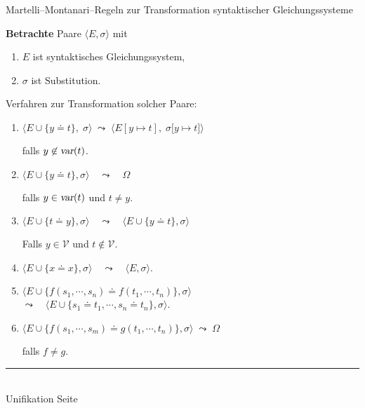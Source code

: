 \documentclass{slides}
\newcommand{\myrule}{\rule{20cm}{1mm}\\ }
\newcounter{mypage}
\begin{document}
\begin{slide}{}
\normalsize
\begin{center}
Martelli--Montanari--Regeln zur Transformation
 syntaktischer Gleichungssysteme 
\end{center}
\vspace{0.5cm}

\footnotesize
\textbf{Betrachte} Paare $\langle E, \sigma \rangle$ mit
\begin{enumerate}
\item $E$ ist syntaktisches Gleichungssystem,
\item $\sigma$ ist Substitution.
\end{enumerate}

Verfahren zur Transformation solcher Paare:
\begin{enumerate}
\item $\langle E \cup \big\{ y \doteq t \big\},\; \sigma \rangle \;\leadsto\; \langle E[y \mapsto t],\; \sigma\big[ y \mapsto t \big]  \rangle$

      falls $y \not\in \textsl{var}(t)$.
\item $\langle E \cup \big\{ y \doteq t \big\}, \sigma \rangle \quad\leadsto\quad \Omega $

      falls $y \in \textsl{var}(t)$ und $t \not= y$.
\item $\langle E \cup \big\{ t \doteq y \big\}, \sigma \rangle \quad\leadsto\quad \langle E \cup \big\{ y \doteq t \big\}, \sigma \rangle$

      Falls $y \in \mathcal{V}$ und $t \not\in \mathcal{V}$.
\item $\langle E \cup \big\{ x \doteq x \big\}, \sigma \rangle \quad\leadsto\quad \langle E, \sigma \rangle$.
\item \hspace*{1.25cm} $\langle E \cup \big\{ f(s_1,\cdots,s_n) \doteq f(t_1,\cdots,t_n) \big\}, \sigma \rangle$ \\[0.2cm]
       $\leadsto\quad \langle E \cup \big\{ s_1 \doteq t_1, \cdots, s_n \doteq t_n\}, \sigma \rangle$.
\item $\langle E \cup \big\{ f(s_1,\cdots,s_m) \doteq g(t_1,\cdots,t_n) \big\}, \sigma \rangle \;\leadsto\; \Omega$

      falls $f \not= g$.
\end{enumerate}



\vspace*{\fill}
\tiny \addtocounter{mypage}{1}
\myrule
Unifikation  \hspace*{\fill} Seite 
\end{slide}
\end{document}
